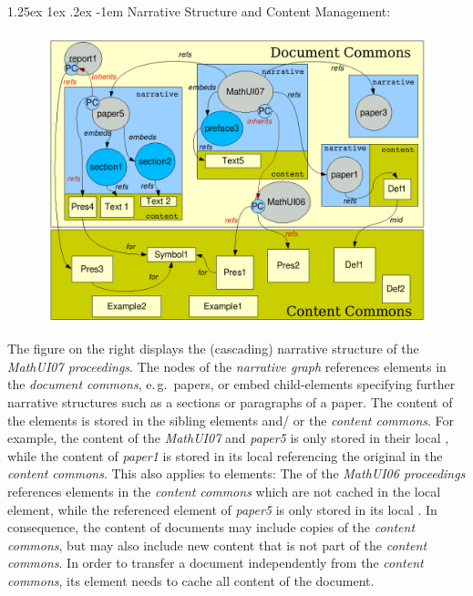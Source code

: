 \documentclass[pdftex,bibtotocnumbered,idxtotoc,11pt]{scrartcl}
\makeatletter
\renewcommand\paragraph{\@startsection{paragraph}{4}{\z@}%
{1.25ex \@plus1ex \@minus.2ex}%
{-1em}%
{\setlength{\parfillskip}{\z@ \@plus 1fil}%
\raggedsection\normalfont\sectfont\nobreak
\size@paragraph\nobreak}}
\makeatother
\begin{document}
\paragraph{Narrative Structure and Content Management:}
\begin{figure}\vspace*{-1.5em}
\includegraphics[width=.5\textwidth]{img/narcon.png}\vspace*{-.5em}
\end{figure}
The figure on the right displays the (cascading) narrative structure of the
{\emph{MathUI07 proceedings}}. The nodes of the {\emph{narrative graph}} references
{} elements in the {\emph{document commons}}, e.\,g.\ papers, or embed
{} child-elements specifying further narrative structures such as a
sections or paragraphs of a paper. The content of the {} elements is stored
in the sibling {} elements and/ or the {\emph{content commons}}. For
example, the content of the {\emph{MathUI07}} and {\emph{paper5}} is only stored in their
local {}, while the content of {\emph{paper1}} is stored in its local
{} referencing the original {\infom} in the {\emph{content commons}}.
This also applies to {} elements: The {} of the
{\emph{MathUI06 proceedings}} references {} elements in the
{\emph{content commons}} which are not cached in the local {} element,
while the referenced {} element of {\emph{paper5}} is only stored in
its local {}. In consequence, the content of documents may include copies
of the {\emph{content commons}}, but may also include new content that is not part of the
{\emph{content commons}}. In order to transfer a document independently from the
{\emph{content commons}}, its {} element needs to cache all content of
the document.
\end{document}
